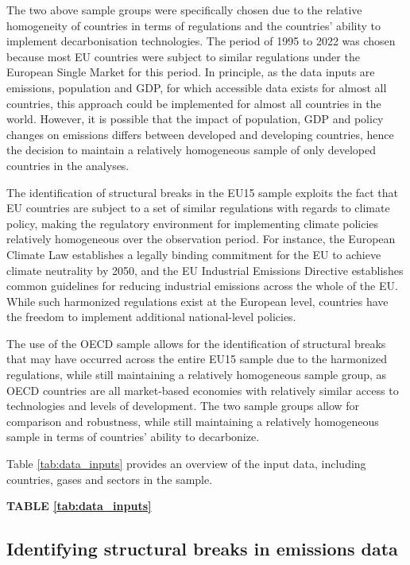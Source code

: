 \documentclass[a4paper]{article}
\begin{document}
The two above sample groups were specifically chosen due to the relative homogeneity of countries in terms of regulations and the countries' ability to implement decarbonisation technologies. The period of 1995 to 2022 was chosen because most EU countries were subject to similar regulations under the European Single Market for this period. In principle, as the data inputs are emissions, population and GDP, for which accessible data exists for almost all countries, this approach could be implemented for almost all countries in the world. However, it is possible that the impact of population, GDP and policy changes on emissions differs between developed and developing countries, hence the decision to maintain a relatively homogeneous sample of only developed countries in the analyses.

The identification of structural breaks in the EU15 sample exploits the fact that EU countries are subject to a set of similar regulations with regards to climate policy, making the regulatory environment for implementing climate policies relatively homogeneous over the observation period. For instance, the European Climate Law establishes a legally binding commitment for the EU to achieve climate neutrality by 2050, and the EU Industrial Emissions Directive establishes common guidelines for reducing industrial emissions across the whole of the EU. While such harmonized regulations exist at the European level, countries have the freedom to implement additional national-level policies.

The use of the OECD sample allows for the identification of structural breaks that may have occurred across the entire EU15 sample due to the harmonized regulations, while still maintaining a relatively homogeneous sample group, as OECD countries are all market-based economies with relatively similar access to technologies and levels of development. The two sample groups allow for comparison and robustness, while still maintaining a relatively homogeneous sample in terms of countries' ability to decarbonize.

Table \ref{tab:data_inputs} provides an overview of the input data, including countries, gases and sectors in the sample.

\bigskip
\begin{center}
    \textbf{TABLE \ref{tab:data_inputs}}
\end{center}

\subsection*{Identifying structural breaks in emissions data}
\end{document}
